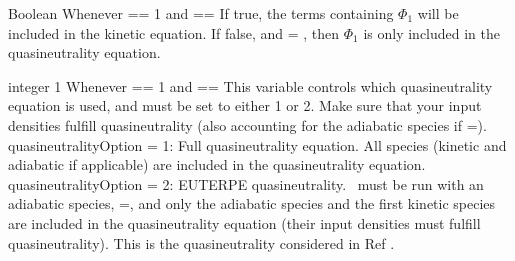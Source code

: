 \myhrule

{Boolean}
{\true}
{Whenever  == 1 and  == \true}
{If true, the terms containing $\Phi_1$ will be included in the kinetic equation. 
If false, and  = \true, then $\Phi_1$ is only included in the quasineutrality equation. 
}

\myhrule

{integer}
{1}
{Whenever  == 1 and  == \true}
{This variable controls which quasineutrality equation is used, and must be set to either 1 or 2. Make sure that your input densities fulfill quasineutrality (also accounting for the adiabatic species if =\true).\\

{\ttfamily quasineutralityOption} = 1: Full quasineutrality equation. All species (kinetic and adiabatic if applicable) are included in the quasineutrality equation.\\

{\ttfamily quasineutralityOption} = 2: {\ttfamily EUTERPE} quasineutrality. \sfincs~must be run with an adiabatic species, =\true, and only the adiabatic species and the first kinetic species are included in the quasineutrality equation (their input densities must fulfill quasineutrality). This is the quasineutrality considered in Ref \cite{Regana2013}.
}


%

%

